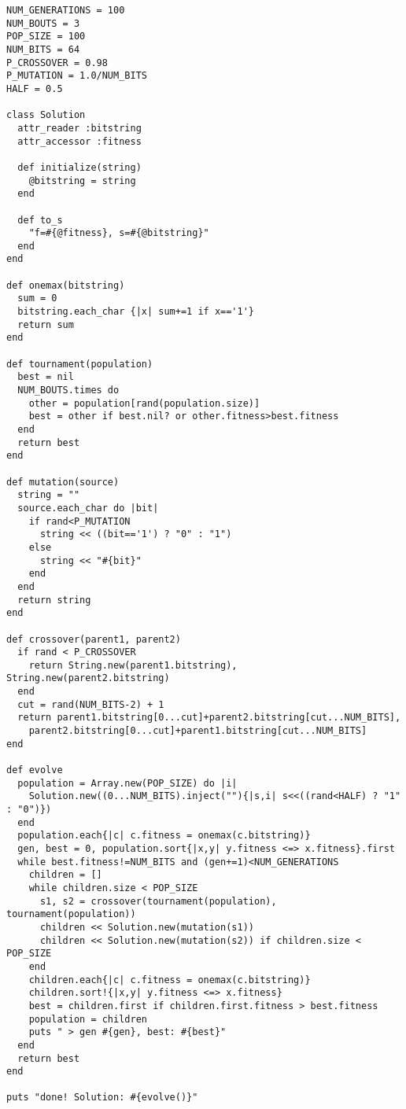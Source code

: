 \documentclass[a4paper, 11pt]{article}
\begin{document}
\lstset{language=Ruby}
\begin{lstlisting}[caption={Genetic Algorithm in the Ruby Programming Language},label=rubyga]
NUM_GENERATIONS = 100
NUM_BOUTS = 3
POP_SIZE = 100
NUM_BITS = 64
P_CROSSOVER = 0.98
P_MUTATION = 1.0/NUM_BITS
HALF = 0.5

class Solution 
  attr_reader :bitstring
  attr_accessor :fitness
  
  def initialize(string)
    @bitstring = string
  end
  
  def to_s
    "f=#{@fitness}, s=#{@bitstring}"
  end
end

def onemax(bitstring)
  sum = 0
  bitstring.each_char {|x| sum+=1 if x=='1'}
  return sum
end

def tournament(population)
  best = nil
  NUM_BOUTS.times do    
    other = population[rand(population.size)]
    best = other if best.nil? or other.fitness>best.fitness
  end
  return best
end

def mutation(source)
  string = ""
  source.each_char do |bit|
    if rand<P_MUTATION
      string << ((bit=='1') ? "0" : "1")
    else 
      string << "#{bit}"
    end
  end
  return string
end

def crossover(parent1, parent2)
  if rand < P_CROSSOVER
    return String.new(parent1.bitstring), String.new(parent2.bitstring)
  end
  cut = rand(NUM_BITS-2) + 1
  return parent1.bitstring[0...cut]+parent2.bitstring[cut...NUM_BITS],
    parent2.bitstring[0...cut]+parent1.bitstring[cut...NUM_BITS]
end

def evolve
  population = Array.new(POP_SIZE) do |i|
    Solution.new((0...NUM_BITS).inject(""){|s,i| s<<((rand<HALF) ? "1" : "0")})
  end
  population.each{|c| c.fitness = onemax(c.bitstring)}
  gen, best = 0, population.sort{|x,y| y.fitness <=> x.fitness}.first  
  while best.fitness!=NUM_BITS and (gen+=1)<NUM_GENERATIONS
    children = []
    while children.size < POP_SIZE
      s1, s2 = crossover(tournament(population), tournament(population))
      children << Solution.new(mutation(s1))
      children << Solution.new(mutation(s2)) if children.size < POP_SIZE
    end
    children.each{|c| c.fitness = onemax(c.bitstring)}
    children.sort!{|x,y| y.fitness <=> x.fitness}
    best = children.first if children.first.fitness > best.fitness
    population = children
    puts " > gen #{gen}, best: #{best}"
  end  
  return best
end

puts "done! Solution: #{evolve()}"
\end{lstlisting}


% 
% 
\end{document}

